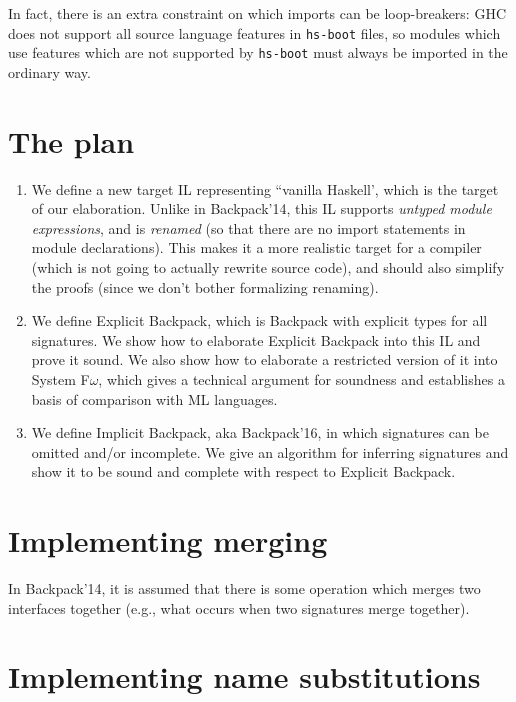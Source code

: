 In fact, there is an extra constraint on which imports can
be loop-breakers: GHC does not support all source language
features in \verb|hs-boot| files, so modules which use features
which are not supported by \verb|hs-boot| must always be
imported in the ordinary way.

\section{The plan}

\begin{enumerate}
    \item We define a new target IL representing ``vanilla Haskell',
    which is the target of our elaboration.  Unlike in Backpack'14, this
    IL supports \emph{untyped module expressions}, and is \emph{renamed}
    (so that there are no import statements in module declarations).
    This makes it a more realistic target for a compiler (which is not
    going to actually rewrite source code), and should also simplify
    the proofs (since we don't bother formalizing renaming).

    \item We define Explicit Backpack, which is Backpack
    with explicit types for all signatures.  We show how to
    elaborate Explicit Backpack into this IL and prove it sound.
    We also show how to elaborate a restricted version of
    it into System F$\omega$, which gives a technical argument for
    soundness and establishes a basis of comparison with ML
    languages.

    \item We define Implicit Backpack, aka Backpack'16, in which
    signatures can be omitted and/or incomplete.  We give an
    algorithm for inferring signatures and show it to be
    sound and complete with respect to Explicit Backpack.
\end{enumerate}

\section{Implementing merging}

In Backpack'14, it is assumed that there is some operation which
merges two interfaces together (e.g., what occurs when two signatures
merge together).

\section{Implementing name substitutions}

